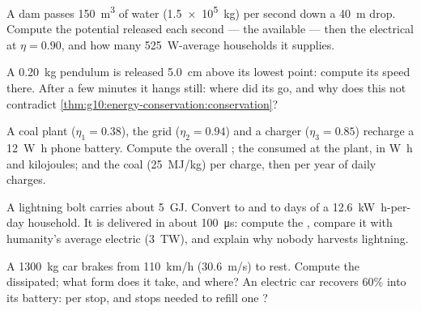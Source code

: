 \begin{exercise}[$\star\star$]\label{exo:g10:energy-conservation:10}
A dam passes \qty{150}{m^3} of water (\qty{1.5e5}{kg}) per second
down a \qty{40}{m} drop. Compute the potential  released each
second --- the available  --- then the electrical  at
$\eta = 0.90$, and how many \qty{525}{W}-average households it supplies.
\end{exercise}

\begin{exercise}[$\star\star$]\label{exo:g10:energy-conservation:11}
A \qty{0.20}{kg} pendulum is released \qty{5.0}{cm} above its
lowest point: compute its speed there. After a few minutes it hangs
still: where did its  go, and why does this not contradict
\cref{thm:g10:energy-conservation:conservation}?
\end{exercise}

\begin{exercise}[$\star\star\star$]\label{exo:g10:energy-conservation:12}
A coal plant ($\eta_1 = 0.38$), the grid ($\eta_2 = 0.94$) and a
charger ($\eta_3 = 0.85$) recharge a \qty{12}{W.h} phone battery.
Compute the overall ; the  consumed at the
plant, in \unit{W.h} and kilojoules; and the coal (\qty{25}{MJ/kg})
per charge, then per year of daily charges.
\end{exercise}

\begin{exercise}[$\star\star\star$]\label{exo:g10:energy-conservation:13}
A lightning bolt carries about \qty{5}{GJ}. Convert to
 and to days of a \qty{12.6}{kW.h}-per-day household.
It is delivered in about \qty{100}{\micro s}: compute the ,
compare it with humanity's average electric  (\qty{3}{TW}), and
explain why nobody harvests lightning.
\end{exercise}

\begin{exercise}[$\star\star\star$]\label{exo:g10:energy-conservation:14}
A \qty{1300}{kg} car brakes from \qty{110}{km/h} (\qty{30.6}{m/s})
to rest. Compute the  dissipated; what form does it
take, and where? An electric car recovers $60\%$ into its battery:
 per stop, and stops needed to refill one ?
\end{exercise}

